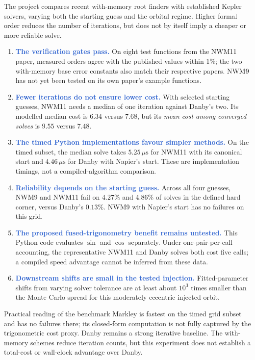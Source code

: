 \documentclass[11pt,a4paper]{article}
\newcommand{\key}[1]{\textcolor{Highlight}{\bfseries #1}}
\begin{document}
The project compares recent with-memory root finders with established
Kepler solvers, varying both the starting guess and the orbital regime.
Higher formal order reduces the number of iterations, but does not by
itself imply a cheaper or more reliable solve.

\begin{enumerate}
  \item \key{The verification gates pass.} On eight test functions from
        the NWM11 paper, measured orders agree with the published values
        within $1\%$; the two with-memory base error constants also match
        their respective papers. NWM9 has not yet been tested on its own
        paper's example functions.
  \item \key{Fewer iterations do not ensure lower cost.} With
        selected starting guesses, NWM11 needs a median of one iteration
        against Danby's two. Its modelled median cost is $6.34$ versus
        $7.68$, but its \emph{mean cost among converged solves} is
        $9.55$ versus $7.48$.
  \item \key{The timed Python implementations favour simpler methods.}
        On the timed subset, the median solve takes $5.25\,\mu\mathrm{s}$ for
        NWM11 with its canonical start and $4.46\,\mu\mathrm{s}$ for Danby
        with Napier's start. These are implementation timings, not a
        compiled-algorithm comparison.
  \item \key{Reliability depends on the starting guess.} Across all four
        guesses, NWM9 and NWM11 fail on $4.27\%$ and $4.86\%$ of solves in
        the defined hard corner, versus Danby's $0.13\%$. NWM9 with
        Napier's start has no failures on this grid.
  \item \key{The proposed fused-trigonometry benefit remains untested.}
        This Python code evaluates $\sin$ and $\cos$ separately. Under
        one-pair-per-call accounting, the representative NWM11 and Danby
        solves both cost five calls; a compiled speed advantage cannot be
        inferred from these data.
  \item \key{Downstream shifts are small in the tested injection.}
        Fitted-parameter shifts from varying solver tolerance are at least
        about $10^3$ times smaller than the Monte Carlo spread for this
        moderately eccentric injected orbit.
\end{enumerate}

\begin{finding}{Practical reading of the benchmark}
Markley is fastest on the timed grid subset and has no failures there;
its closed-form computation is not fully captured by the trigonometric
cost proxy. Danby remains a strong iterative baseline. The with-memory
schemes reduce iteration counts, but this experiment does not establish a
total-cost or wall-clock advantage over Danby.
\end{finding}
\end{document}

